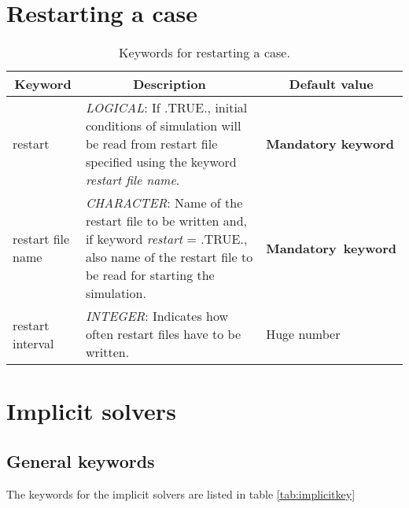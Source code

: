\documentclass[a4paper,10pt]{report}
\begin{document}
\chapter{Restarting a case}

\begin{table}[htbp]
\caption{Keywords for restarting a case.}
\begin{tabular}{|l|p{10cm}|p{2.2cm}|}
\hline
\multicolumn{1}{|c|}{Keyword} & \multicolumn{1}{c|}{Description} & \multicolumn{1}{c|}{Default value} \\ \hline

restart 			& \textit{LOGICAL}: If .TRUE., initial conditions of simulation will be read from restart file specified using the keyword \textit{restart file name}. & \textbf{Mandatory keyword} \\ \hline

restart file name   & \textit{CHARACTER}: Name of the restart file to be written and, if keyword \textit{restart} = .TRUE., also name of the restart file to be read for starting the simulation. & \textbf{Mandatory\ keyword} \\ \hline

restart interval    & \textit{INTEGER}: Indicates how often restart files have to be written. & Huge number \\ \hline
\end{tabular}
\label{tab:restartkey}
\end{table}


\chapter{Implicit solvers}
\section{General keywords}
The keywords for the implicit solvers are listed in table \ref{tab:implicitkey}
\end{document}
